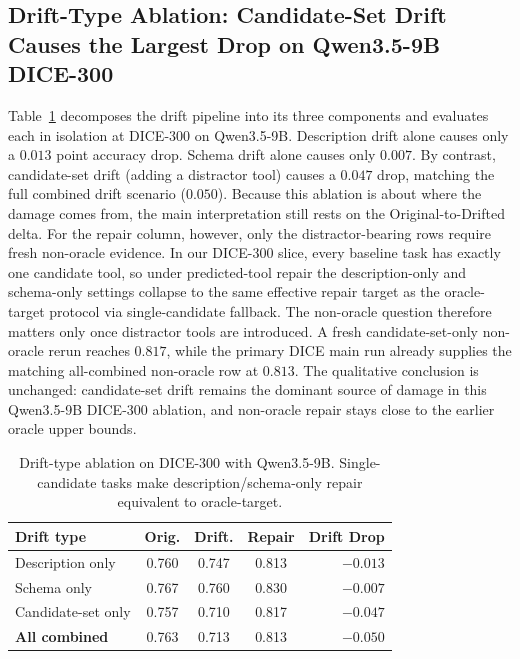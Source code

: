 \documentclass{llncs}
\begin{document}
\subsection{Drift-Type Ablation: Candidate-Set Drift Causes the Largest Drop on
Qwen3.5-9B DICE-300}
\label{sec:drift-ablation}
Table~\ref{tab:drift-ablation} decomposes the drift pipeline into its three
components and evaluates each in isolation at DICE-300 on Qwen3.5-9B. Description
drift alone causes only a $0.013$ point accuracy drop. Schema drift alone causes
only $0.007$. By contrast, candidate-set drift (adding a distractor tool) causes a
$0.047$ drop, matching the full combined drift scenario ($0.050$). Because this
ablation is about where the damage comes from, the main interpretation still rests
on the Original-to-Drifted delta. For the repair column, however, only the
distractor-bearing rows require fresh non-oracle evidence. In our DICE-300 slice,
every baseline task has exactly one candidate tool, so under predicted-tool repair
the description-only and schema-only settings collapse to the same effective repair
target as the oracle-target protocol via single-candidate fallback. The non-oracle
question therefore matters only once distractor tools are introduced. A fresh
candidate-set-only non-oracle rerun reaches $0.817$, while the primary DICE main
run already supplies the matching all-combined non-oracle row at $0.813$. The
qualitative conclusion is unchanged: candidate-set drift remains the dominant
source of damage in this Qwen3.5-9B DICE-300 ablation, and non-oracle repair stays
close to the earlier oracle upper bounds.

\begin{table}[t]
\caption{Drift-type ablation on DICE-300 with Qwen3.5-9B. Single-candidate tasks
make description/schema-only repair equivalent to oracle-target.}
\label{tab:drift-ablation}
\centering
\small
\begin{tabular}{lcccr}
\toprule
Drift type & Orig. & Drift. & Repair & Drift Drop \\
\midrule
Description only     & 0.760 & 0.747 & 0.813 & $-0.013$ \\
Schema only          & 0.767 & 0.760 & 0.830 & $-0.007$ \\
Candidate-set only   & 0.757 & 0.710 & 0.817 & $-0.047$ \\
\textbf{All combined}& 0.763 & 0.713 & 0.813 & $-0.050$ \\
\bottomrule
\end{tabular}
\end{table}
\end{document}
